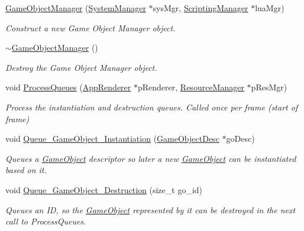 \begin{DoxyCompactItemize}
\item 
\hyperlink{classGameObjectManager_af092ff9e97731c99cb0d4f258d7d4949}{Game\+Object\+Manager} (\hyperlink{classSystemManager}{System\+Manager} $\ast$sys\+Mgr, \hyperlink{classScriptingManager}{Scripting\+Manager} $\ast$lua\+Mgr)
\begin{DoxyCompactList}\small\item\em Construct a new Game Object Manager object. \end{DoxyCompactList}\item 
\mbox{\label{classGameObjectManager_a91d57baff47ce5090e5e4590f531051d}} 
\hyperlink{classGameObjectManager_a91d57baff47ce5090e5e4590f531051d}{$\sim$\+Game\+Object\+Manager} ()
\begin{DoxyCompactList}\small\item\em Destroy the Game Object Manager object. \end{DoxyCompactList}\item 
void \hyperlink{classGameObjectManager_a9456fff658ca2a9c13490a8a5635644c}{Process\+Queues} (\hyperlink{classAppRenderer}{App\+Renderer} $\ast$p\+Renderer, \hyperlink{classResourceManager}{Resource\+Manager} $\ast$p\+Res\+Mgr)
\begin{DoxyCompactList}\small\item\em Process the instantiation and destruction queues. Called once per frame (start of frame) \end{DoxyCompactList}\item 
void \hyperlink{classGameObjectManager_a031d2e21f35fb9c84ad01b25330a75a1}{Queue\+\_\+\+Game\+Object\+\_\+\+Instantiation} (\hyperlink{structGameObjectDesc}{Game\+Object\+Desc} $\ast$go\+Desc)
\begin{DoxyCompactList}\small\item\em Queues a \hyperlink{classGameObject}{Game\+Object} descriptor so later a new \hyperlink{classGameObject}{Game\+Object} can be instantiated based on it. \end{DoxyCompactList}\item 
void \hyperlink{classGameObjectManager_a79fb81780af71ad130541f47dc281a4c}{Queue\+\_\+\+Game\+Object\+\_\+\+Destruction} (size\+\_\+t go\+\_\+id)
\begin{DoxyCompactList}\small\item\em Queues an ID, so the \hyperlink{classGameObject}{Game\+Object} represented by it can be destroyed in the next call to Process\+Queues. \end{DoxyCompactList}\item 

\end{DoxyCompactItemize}
